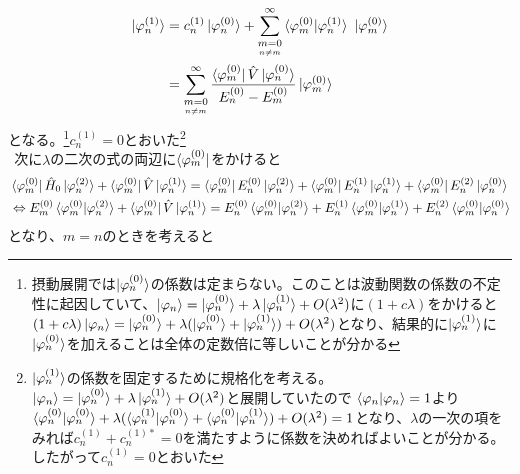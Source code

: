 \documentclass{jsarticle}  %
\numberwithin{equation}{section} %
\numberwithin{figure}{section}
\begin{document}
    \begin{align}
        \ket{\varphi_n^{(1)}} &= c_n^{(1)}\ket{\varphi_n^{(0)}} + \sum_{\underset{n\ne m}{m=0}}^\infty \braket{\varphi_m^{(0)}|\varphi_n^{(1)}}\ \ket{\varphi_m^{(0)}} \notag \\
        &=  \sum_{\underset{n\ne m}{m=0}}^\infty \frac{\bra{\varphi_m^{(0)}}\hat{V}\ket{\varphi_n^{(0)}}}{E_n^{(0)}-E_m^{(0)}}\ket{\varphi_m^{(0)}}
    \end{align}
    となる。\footnote{摂動展開では$\ket{\varphi_n^{(0)}}$の係数は定まらない。このことは波動関数の係数の不定性に起因していて、$\ket{\varphi_n} = \ket{\varphi_n^{(0)}} + \lambda \ket{\varphi_n^{(1)}} + O(\lambda^2)$に$(1+c\lambda )$をかけると$(1+c\lambda) \ket{\varphi_n} = \ket{\varphi_n^{(0)} } + \lambda (\ket   {\varphi_n^{(0)}} + \ket{\varphi_n^{(1)}}) + O(\lambda^2)$となり、結果的に$\ket{\varphi_n^{(1)}}$に$\ket{\varphi_n^{(0)}}$を加えることは全体の定数倍に等しいことが分かる}$c_n^{(1)}=0$とおいた\footnote{$\ket{\varphi_n^{(1)}}$の係数を固定するために規格化を考える。$\ket{\varphi_n} = \ket{\varphi_n^{(0)}} + \lambda \ket{\varphi_n^{(1)}} + O(\lambda^2)$と展開していたので $\braket{\varphi_n|\varphi_n} = 1$より$\braket{\varphi_n^{(0)}|\varphi_n^{(0)}} + \lambda (\braket{\varphi_n^{(1)}|\varphi_n^{(0)}} + \braket{\varphi_n^{(0)}|\varphi_n^{(1)}}) + O(\lambda^2) = 1$となり、$\lambda$の一次の項をみれば$c_n^{(1)} + c_n^{(1)*} = 0 $を満たすように係数を決めればよいことが分かる。したがって$c_n^{(1)}=0$とおいた}\\
    $\ \ $次に$\lambda$の二次の式の両辺に$\bra{\varphi_m^{(0)}}$をかけると
    \begin{align}
        &\bra{\varphi_m^{(0)}}\hat{H}_0 \ket{\varphi_n^{(2)}} + \bra{\varphi_m^{(0)}}\hat{V}\ket{\varphi_n^{(1)}} = \bra{\varphi_m^{(0)}}E_n^{(0)}\ket{\varphi_n^{(2)}} + \bra{\varphi_m^{(0)}}E_n^{(1)}\ket{\varphi_n^{(1)}} + \bra{\varphi_m^{(0)}}E_n^{(2)}\ket{\varphi_n^{(0)}} \notag \\
        &\Leftrightarrow E_m^{(0)}\braket{\varphi_m^{(0)}|\varphi_n^{(2)}} + \bra{\varphi_m^{(0)}}\hat{V}\ket{\varphi_n^{(1)}} = E_n^{(0)}\braket{\varphi_m^{(0)}|\varphi_n^{(2)}} + E_n^{(1)}\braket{\varphi_m^{(0)}|\varphi_n^{(1)}} + E_n^{(2)}\braket{\varphi_m^{(0)}|\varphi_n^{(0)}} 
    \end{align}
    となり、$m=n$のときを考えると
\end{document}
